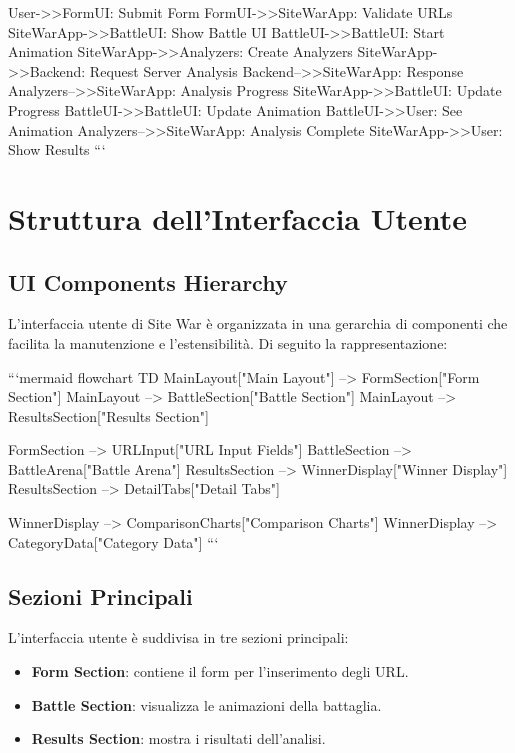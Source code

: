     User->>FormUI: Submit Form
    FormUI->>SiteWarApp: Validate URLs
    SiteWarApp->>BattleUI: Show Battle UI
    BattleUI->>BattleUI: Start Animation
    SiteWarApp->>Analyzers: Create Analyzers
    SiteWarApp->>Backend: Request Server Analysis
    Backend-->>SiteWarApp: Response
    Analyzers-->>SiteWarApp: Analysis Progress
    SiteWarApp->>BattleUI: Update Progress
    BattleUI->>BattleUI: Update Animation
    BattleUI->>User: See Animation
    Analyzers-->>SiteWarApp: Analysis Complete
    SiteWarApp->>User: Show Results
```

\section{Struttura dell'Interfaccia Utente}

\subsection{UI Components Hierarchy}
L'interfaccia utente di Site War è organizzata in una gerarchia di componenti che facilita la manutenzione e l'estensibilità. Di seguito la rappresentazione:

```mermaid
flowchart TD
    MainLayout["Main Layout"] --> FormSection["Form Section"]
    MainLayout --> BattleSection["Battle Section"]
    MainLayout --> ResultsSection["Results Section"]
    
    FormSection --> URLInput["URL Input Fields"]
    BattleSection --> BattleArena["Battle Arena"]
    ResultsSection --> WinnerDisplay["Winner Display"]
    ResultsSection --> DetailTabs["Detail Tabs"]
    
    WinnerDisplay --> ComparisonCharts["Comparison Charts"]
    WinnerDisplay --> CategoryData["Category Data"]
```

\subsection{Sezioni Principali}
L'interfaccia utente è suddivisa in tre sezioni principali:
\begin{itemize}
    \item \textbf{Form Section}: contiene il form per l'inserimento degli URL.
    \item \textbf{Battle Section}: visualizza le animazioni della battaglia.
    \item \textbf{Results Section}: mostra i risultati dell'analisi.
\end{itemize}

